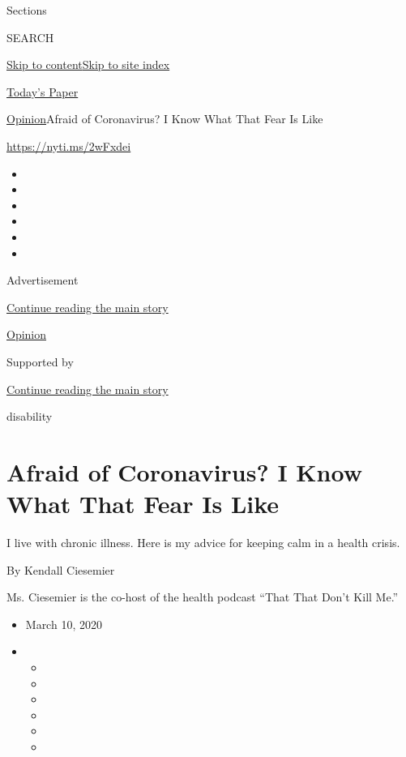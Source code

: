 Sections

SEARCH

\protect\hyperlink{site-content}{Skip to
content}\protect\hyperlink{site-index}{Skip to site index}

\href{https://myaccount.nytimes.com/auth/login?response_type=cookie\&client_id=vi}{}

\href{https://www.nytimes.com/section/todayspaper}{Today's Paper}

\href{/section/opinion}{Opinion}\textbar{}Afraid of Coronavirus? I Know
What That Fear Is Like

\href{https://nyti.ms/2wFxdei}{https://nyti.ms/2wFxdei}

\begin{itemize}
\item
\item
\item
\item
\item
\item
\end{itemize}

Advertisement

\protect\hyperlink{after-top}{Continue reading the main story}

\href{/section/opinion}{Opinion}

Supported by

\protect\hyperlink{after-sponsor}{Continue reading the main story}

disability

\hypertarget{afraid-of-coronavirus-i-know-what-that-fear-is-like}{%
\section{Afraid of Coronavirus? I Know What That Fear Is
Like}\label{afraid-of-coronavirus-i-know-what-that-fear-is-like}}

I live with chronic illness. Here is my advice for keeping calm in a
health crisis.

By Kendall Ciesemier

Ms. Ciesemier is the co-host of the health podcast ``That That Don't
Kill Me.''

\begin{itemize}
\item
  March 10, 2020
\item
  \begin{itemize}
  \item
  \item
  \item
  \item
  \item
  \item
  \end{itemize}
\end{itemize}

